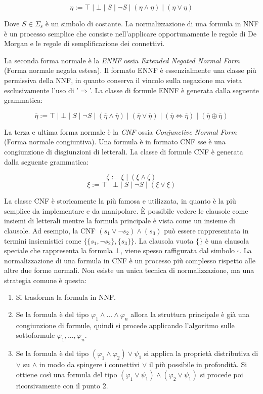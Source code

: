 \documentclass[./main.tex]{subfiles}
\begin{document}
$$ \eta := \top \mid \bot \mid S \mid \lnot S \mid (\eta \land \eta) \mid (\eta \lor \eta ) $$

Dove $S \in \Sigma_s$ è un simbolo di costante. La normalizzazione di una formula in NNF è un processo semplice che consiste nell'applicare opportunamente 
le regole di De Morgan e le regole di semplificazione dei connettivi.

La seconda forma normale è la \textit{ENNF} ossia \textit{Extended Negated Normal Form} (Forma normale negata estesa). 
Il formato ENNF è essenzialmente una classe più permissiva della NNF, in quanto conserva il vincolo sulla negazione ma 
vieta esclusivamente l'uso di '$\Rightarrow$'. La classe di formule ENNF è generata dalla seguente grammatica:
 
$$ \overline{\eta}  := \top \mid \bot \mid S \mid \lnot S \mid (\overline{\eta} \land \overline{\eta}) \mid (\overline{\eta} \lor \overline{\eta} ) \mid (\overline{\eta} \Leftrightarrow \overline{\eta}) \mid (\overline{\eta} \oplus \overline{\eta}) $$

La terza e ultima forma normale è la \textit{CNF} ossia \textit{Conjunctive Normal Form} (Forma normale congiuntiva). Una formula è in formato CNF
sse è una congiunzione di disgiunzioni di letterali. La classe di formule CNF è generata dalla seguente grammatica:


$$ \zeta := \xi \mid (\xi \land \zeta) $$
$$ \xi := \top \mid \bot \mid S \mid \lnot S \mid (\xi \lor \xi ) $$

La classe CNF è storicamente la più famosa e utilizzata, in quanto è la più semplice da implementare e da manipolare. È possibile vedere le clausole
come insiemi di letterali mentre la formula principale è vista come un insieme di clausole. Ad esempio, la CNF $(s_1 \lor \lnot s_2) \land (s_3)$ può essere rappresentata
in termini insiemistici come $\{\{s_1, \lnot s_2\}, \{s_3\}\}$. 
La clausola vuota $\{\}$ è una clausola speciale che rappresenta la formula $\bot$, viene spesso raffigurata dal simbolo $\square$.
La normalizzazione di una formula in CNF è un processo più complesso rispetto alle altre due forme normali. Non esiste un unica tecnica di normalizzazione, ma
una strategia comune è questa:
\begin{enumerate}
  \item Si trasforma la formula in NNF.
  \item Se la formula è del tipo $\varphi_1 \land ... \land \varphi_n$ allora la struttura principale è già una congiunzione di formule,
   quindi si procede applicando l'algoritmo sulle sottoformule $\varphi_1, ..., \varphi_n$.
  \item Se la formula è del tipo $(\varphi_1 \land \varphi_2) \lor \psi_1$ si applica la proprietà distributiva di $\lor$ su $\land$ in 
  modo da spingere i connettivi $\lor$ il più possibile in profondità. Si ottiene così una formula del tipo
  $(\varphi_1 \lor \psi_1) \land (\varphi_2 \lor \psi_1)$ si procede poi ricorsivamente con il punto 2.
\end{enumerate}
\end{document}
